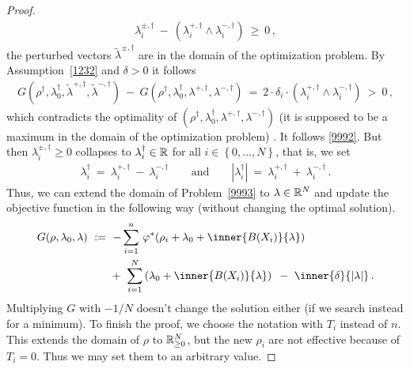 \begin{proof}
\begin{gather*}
      \lambda_i^{\pm,\dagger}
      \!
      \ 
      -
      \ 
      (
      \lambda_i^{+,\dagger}
      \!
      \land
      \lambda_i^{-,\dagger}
      )
      \ 
      \ge 
      \ 
      0
      \,,
  \end{gather*}
  the perturbed vectors $\tilde{\lambda}^{\pm,\dagger}$ are  in the domain of the 
  optimization problem.
  By Assumption~\eqref{1232} and $\delta>0$ it follows
  \begin{align*}
  G
  \left( 
  \rho^\dagger,\lambda_0^\dagger,\tilde{\lambda}^{+,\dagger},\tilde{\lambda}^{-,\dagger}
  \right)
  \ 
  -
  \ 
  G
  \left( 
  \rho^\dagger,\lambda_0^\dagger,\lambda^{+,\dagger},\lambda^{-,\dagger}
  \right)
  \ 
  =
  \ 
  2
  \cdot
  \delta_i
  \cdot
      (
      \lambda_i^{+,\dagger}
      \!
      \land
      \lambda_i^{-,\dagger}
      )
  \ 
  >
  \ 
  0
  \,,
  \end{align*}
  which contradicts the optimality of
$
  (\rho^\dagger,\lambda_0^\dagger,\lambda^{+,\dagger},\lambda^{-,\dagger})
$
(it is supposed to be a maximum in the domain of the optimization problem)
.
It follows \eqref{9992}.
But then 
$
\lambda^{\pm,\dagger}_i
\ge 0
$
collapses to
$
\lambda_i^\dagger\in \mathbb{R}
$ 
for all
$i\in \left\{ 0,\ldots,N \right\}$, that is, we set
\begin{gather*}
 \lambda_i^\dagger
 \ 
 =
 \ 
 \lambda_i^{+,\dagger}
 \ 
 -
 \ 
 \lambda_i^{-,\dagger}
 \qquad
 \text{and}
 \qquad
|\lambda_i^\dagger|
\ 
=
\ 
\lambda_i^{+,\dagger}
\ 
+
\ 
\lambda_i^{-,\dagger}
\,.
\end{gather*}
Thus, we can extend the domain of Problem~\ref{9993} to $\lambda\in\mathbb{R}^{N}$ and update the objective function in the following way
(without changing the optimal solution).
\begin{align*}
  G
  (\rho,\lambda_0,\lambda)
  &
  \ 
  :=
  \ 
 -
\sum_{i=1} 
  ^n
    \,
  \varphi^*
  \!
  \left( 
    \rho_i
    +
\lambda_0
+
\inner
{B(X_i)}
{
\lambda
}
  \right)
  \\
  &
  \qquad
+
\ 
\sum_{i=1}^{N} 
  \left( 
\lambda_0
+
\inner
{B(X_i)}
{
\lambda
}
  \right)
  \,
  \ 
-
\ 
\inner
{\delta}
{
  |\lambda|
}
  \,.
\end{align*}
Multiplying $G$ with $-1/N$ doesn't change the solution either
(if we search instead for a minimum).
To finish the proof, we choose the notation with $T_i$ instead of $n$. This extends the domain of $\rho$ to $\mathbb{R}^N_{\ge 0}$, but the 
new $\rho_i$ are not effective because of $T_i=0$. 
Thus we may set them to an arbitrary value.
\end{proof}
